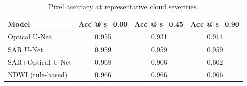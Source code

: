 \begin{table}[t]
\centering
\caption{Pixel accuracy at representative cloud severities.}
\label{tab:acc_by_severity}
\begin{tabular}{lccc}
\toprule
Model & Acc @ s=0.00 & Acc @ s=0.45 & Acc @ s=0.90 \\
\midrule
Optical U-Net & 0.955 & 0.931 & 0.914 \\
SAR U-Net & 0.959 & 0.959 & 0.959 \\
SAR+Optical U-Net & 0.968 & 0.906 & 0.602 \\
NDWI (rule-based) & 0.966 & 0.966 & 0.966 \\
\bottomrule
\end{tabular}
\end{table}